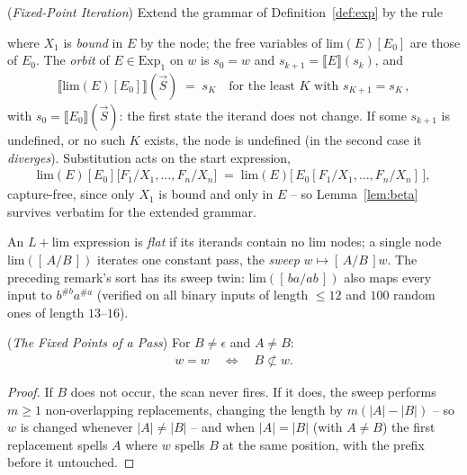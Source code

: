 \begin{definition}
    (\emph{Fixed-Point Iteration})
    \label{def:lim}
    Extend the grammar of Definition~\ref{def:exp} by the rule
    \begin{mathpar}
    \end{mathpar}
    where $X_1$ is \emph{bound} in $E$ by the node; the free variables of
    $\mathrm{lim}(E)[E_0]$ are those of $E_0$. The \emph{orbit} of
    $E \in \mathrm{Exp}_1$ on $w$ is $s_0 = w$ and
    $s_{k+1} = \llbracket E \rrbracket(s_k)$, and
    \begin{align}
        \llbracket \mathrm{lim}(E)[E_0] \rrbracket(\vec S) \;=\; s_K
        \quad \text{for the least $K$ with } s_{K+1} = s_K\,,
    \end{align}
    with $s_0 = \llbracket E_0 \rrbracket(\vec S)$: the first state the
    iterand does not change. If some $s_{k+1}$ is undefined, or no such
    $K$ exists, the node is undefined (in the second case it
    \emph{diverges}). Substitution acts on the start expression,
    \begin{align}
        \mathrm{lim}(E)[E_0]\big[F_1/X_1, \dots, F_n/X_n\big]
        \;=\; \mathrm{lim}(E)\big[\,E_0[F_1/X_1, \dots, F_n/X_n]\,\big],
    \end{align}
    capture-free, since only $X_1$ is bound and only in $E$ -- so
    Lemma~\ref{lem:beta} survives verbatim for the extended grammar.
\end{definition}

An $L{+}\mathrm{lim}$ expression is \emph{flat} if its iterands contain no
$\mathrm{lim}$ nodes; a single node $\mathrm{lim}([\,A/B\,])$ iterates one
constant pass, the \emph{sweep} $w \mapsto [\,A/B\,]w$. The preceding
remark's sort has its sweep twin: $\mathrm{lim}([\,ba/ab\,])$ also maps
every input to $b^{\#b}a^{\#a}$ (verified on all binary inputs of length
$\leq 12$ and $100$ random ones of length $13$--$16$).

\begin{lemma}
    (\emph{The Fixed Points of a Pass})
    \label{lem:fpsweep}
    For $B \neq \epsilon$ and $A \neq B$:
    \begin{align}
        [\,A/B\,]w = w \quad\Longleftrightarrow\quad B \not\subset w .
    \end{align}
\end{lemma}

\begin{proof}
    If $B$ does not occur, the scan never fires. If it does, the sweep
    performs $m \geq 1$ non-overlapping replacements, changing the length
    by $m(|A| - |B|)$ -- so $w$ is changed whenever $|A| \neq |B|$ -- and
    when $|A| = |B|$ (with $A \neq B$) the first replacement spells $A$
    where $w$ spells $B$ at the same position, with the prefix before it
    untouched.
\end{proof}

